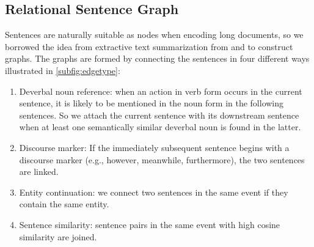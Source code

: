 
\subsection{Relational Sentence Graph}

Sentences are naturally suitable as nodes when encoding long documents, so we borrowed the idea from extractive text summarization from \citet{christensen-etal-2013-towards} and \citet{summpip} to construct graphs. The graphs are formed by connecting the sentences in four different ways illustrated in \ref{subfig:edgetype}:

\begin{enumerate} \label{para:edge}
    \item Deverbal noun reference: when an action in verb form occurs in the current sentence, it is likely to be mentioned in the noun form in the following sentences. So we attach the current sentence with its downstream sentence when at least one semantically similar deverbal noun is found in the latter.
    
    \item Discourse marker: If the immediately subsequent sentence begins with a discourse marker (e.g., however, meanwhile, furthermore), the two sentences are linked.
    
    \item Entity continuation: we connect two sentences in the same event if they contain the same entity.
    
    \item Sentence similarity: sentence pairs in the same event with high cosine similarity are joined.
    
\end{enumerate}


